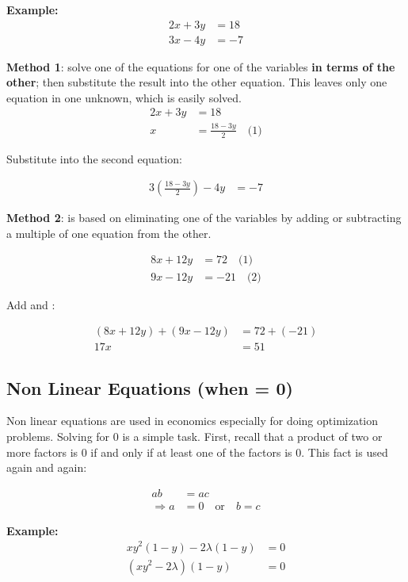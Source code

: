 \documentclass{article}
\begin{document}
\textbf{Example:}
\begin{align*}
2x + 3y &= 18 \\
3x - 4y &= -7
\end{align*}

\textbf{Method 1}: solve one of the equations for one of the variables \textbf{in terms of the other}; then substitute the result into the other equation. This leaves only one equation in one unknown, which is easily solved.
\begin{align*}
2x + 3y &= 18 \\
x &= \frac{18 - 3y}{2} \quad \text{(1)}
\end{align*}

Substitute  into the second equation:

\begin{align*}
3\left(\frac{18 - 3y}{2}\right) - 4y &= -7
\end{align*}

\textbf{Method 2}: is based on eliminating one of the variables by adding or subtracting a multiple of one equation from the other.

\begin{align*}
8x + 12y &= 72 \quad \text{(1)} \\
9x - 12y &= -21 \quad \text{(2)}
\end{align*}

Add  and :

\begin{align*}
(8x + 12y) + (9x - 12y) &= 72 + (-21) \\
17x &= 51
\end{align*}

\subsection{Non Linear Equations (when = 0)}

Non linear equations are used in economics especially for doing optimization problems. Solving for 0 is a simple task. First, recall that a product of two or more factors is 0 if and only if at least one of the factors is 0. This fact is used again and again:

\begin{align*}
ab &= ac \\
\Rightarrow a &= 0 \quad \text{or} \quad b = c
\end{align*}

\textbf{Example: }
\begin{equation*}
\begin{split}
    xy^2(1-y) -2 \lambda(1-y) &= 0 \\
    (xy^2 - 2 \lambda)(1-y) &= 0
\end{split}
\end{equation*}
\end{document}
